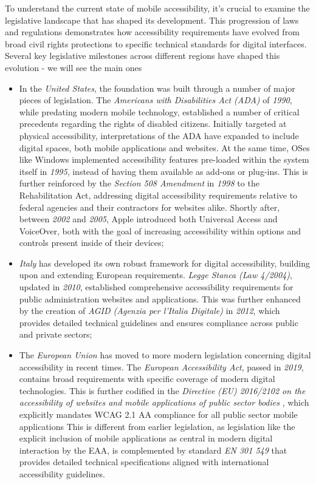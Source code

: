 To understand the current state of mobile accessibility, it's crucial to examine the legislative landscape that has shaped its development. This progression of laws and regulations demonstrates how accessibility requirements have evolved from broad civil rights protections to specific technical standards for digital interfaces. Several key legislative milestones across different regions have shaped this evolution - we will see the main ones 

\begin{itemize}
    \item In the \textit{United States}, the foundation was built through a number of major pieces of legislation. The \textit{Americans with Disabilities Act (ADA)} of \textit{1990}, while predating modern mobile technology, established a number of critical precedents regarding the rights of disabled citizens. Initially targeted at physical accessibility, interpretations of the ADA have expanded to include digital spaces, both mobile applications and websites. At the same time, OSes like Windows implemented accessibility features pre-loaded within the system itself in \textit{1995}, instead of having them available as add-ons or plug-ins. This is further reinforced by the \textit{Section 508 Amendment} in \textit{1998} \cite{eo14028} to the Rehabilitation Act, addressing digital accessibility requirements relative to federal agencies and their contractors for websites alike. Shortly after, between \textit{2002} and \textit{2005}, Apple introduced both Universal Access and VoiceOver, both with the goal of increasing accessibility within options and controls present inside of their devices;
    
    \item \textit{Italy} has developed its own robust framework for digital accessibility, building upon and extending European requirements. \textit{Legge Stanca (Law 4/2004)}, updated in \textit{2010}, established comprehensive accessibility requirements for public administration websites and applications. This was further enhanced by the creation of \textit{AGID (Agenzia per l'Italia Digitale)} in \textit{2012}, which provides detailed technical guidelines and ensures compliance across public and private sectors;
    
    \item The \textit{European Union} has moved to more modern legislation concerning digital accessibility in recent times. The \textit{European Accessibility Act}, passed in \textit{2019}, contains broad requirements with specific coverage of modern digital technologies. This is further codified in the \textit{Directive (EU) 2016/2102 on the accessibility of websites and mobile applications of public sector bodies} \cite{eu2016directive}, which explicitly mandates WCAG 2.1 AA compliance for all public sector mobile applications This is different from earlier legislation, as legislation like the explicit inclusion of mobile applications as central in modern digital interaction by the EAA, is complemented by standard \textit{EN 301 549} that provides detailed technical specifications aligned with international accessibility guidelines.
\end{itemize}

